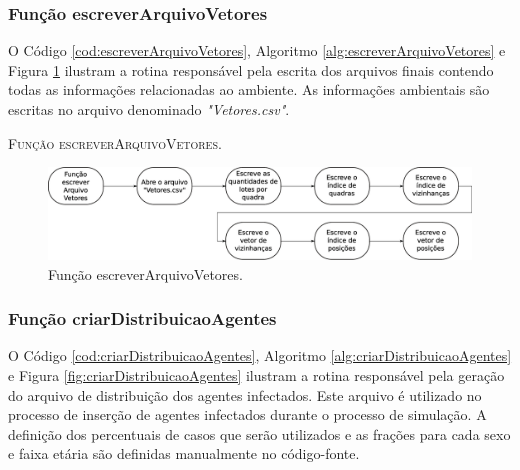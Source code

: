 \newpage

\subsubsection{Função escreverArquivoVetores}

O Código \ref{cod:escreverArquivoVetores}, Algoritmo \ref{alg:escreverArquivoVetores} e Figura \ref{fig:escreverArquivoVetores} ilustram a rotina responsável pela escrita dos arquivos finais contendo todas as informações relacionadas ao ambiente. As informações ambientais são escritas no arquivo denominado \textit{"Vetores.csv"}.



\newpage

\begin{algorithm}[H]
   \SetAlgoLined   
   
   \caption{\textsc{Função escreverArquivoVetores.}}
   \label{alg:escreverArquivoVetores}
\end{algorithm}

\begin{figure}[H]
  \centering
  \includegraphics[width=1\textwidth]{Figuras/Simula/Fluxos/escreverArquivoVetores.eps}
  \caption{Função escreverArquivoVetores.}
  \label{fig:escreverArquivoVetores}
\end{figure} 

\newpage

\subsubsection{Função criarDistribuicaoAgentes}

O Código \ref{cod:criarDistribuicaoAgentes}, Algoritmo \ref{alg:criarDistribuicaoAgentes} e Figura \ref{fig:criarDistribuicaoAgentes} ilustram a rotina responsável pela geração do arquivo de distribuição dos agentes infectados. Este arquivo é utilizado no processo de inserção de agentes infectados durante o processo de simulação. A definição dos percentuais de casos que serão utilizados e as frações para cada sexo e faixa etária são definidas manualmente no código-fonte. 

